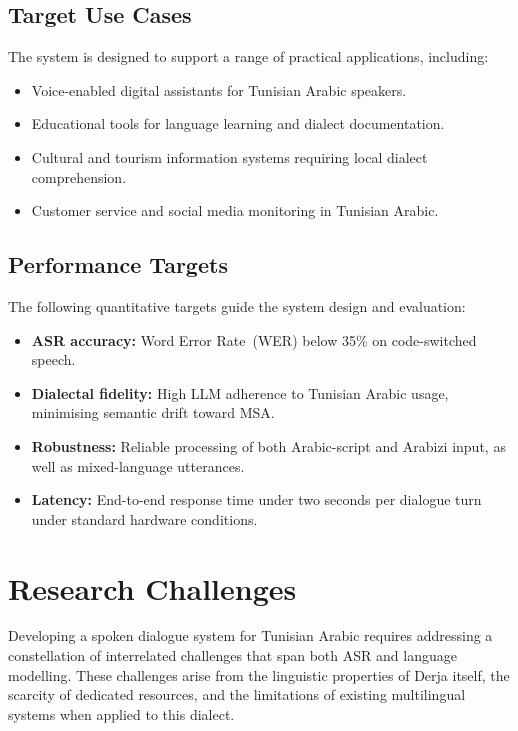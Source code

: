 \documentclass[12pt,a4paper]{report}
\begin{document}
\subsection{Target Use Cases}

The system is designed to support a range of practical applications, including:

\begin{itemize}
    \item Voice-enabled digital assistants for Tunisian Arabic speakers.
    \item Educational tools for language learning and dialect documentation.
    \item Cultural and tourism information systems requiring local dialect comprehension.
    \item Customer service and social media monitoring in Tunisian Arabic.
\end{itemize}

\subsection{Performance Targets}

The following quantitative targets guide the system design and evaluation:

\begin{itemize}
    \item \textbf{ASR accuracy:} Word Error Rate~(WER) below 35\% on code-switched speech.
    \item \textbf{Dialectal fidelity:} High LLM adherence to Tunisian Arabic usage,
          minimising semantic drift toward MSA.
    \item \textbf{Robustness:} Reliable processing of both Arabic-script and Arabizi
          input, as well as mixed-language utterances.
    \item \textbf{Latency:} End-to-end response time under two seconds per dialogue turn
          under standard hardware conditions.
\end{itemize}

\section{Research Challenges}
\label{sec:challenges}

Developing a spoken dialogue system for Tunisian Arabic requires addressing a constellation
of interrelated challenges that span both ASR and language modelling. These challenges arise
from the linguistic properties of Derja itself, the scarcity of dedicated resources, and the
limitations of existing multilingual systems when applied to this dialect.
\end{document}
